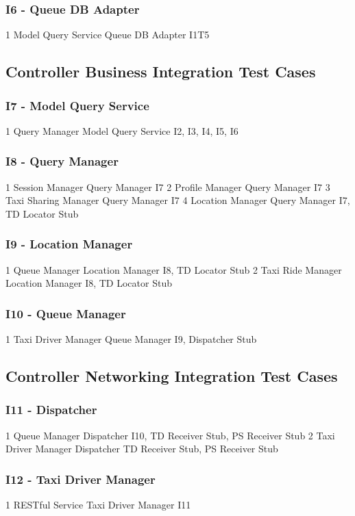 \subsubsection{I6 - Queue DB Adapter}
\testCaseSimpleSimple
	{1}
	{Model Query Service}
	{Queue DB Adapter}
	{I1T5}
\subsection{Controller Business Integration Test Cases}
\subsubsection{I7 - Model Query Service}
\testCaseSimpleSimple
	{1}
	{Query Manager}
	{Model Query Service}
	{I2, I3, I4, I5, I6}
\subsubsection{I8 - Query Manager}
\testCaseSimpleSimple
	{1}
	{Session Manager}
	{Query Manager}
	{I7}
\testCaseSimpleSimple
	{2}
	{Profile Manager}
	{Query Manager}
	{I7}
\testCaseSimpleSimple
	{3}
	{Taxi Sharing Manager}
	{Query Manager}
	{I7}
\testCaseSimpleSimple
	{4}
	{Location Manager}
	{Query Manager}
	{I7, TD Locator Stub}
\subsubsection{I9 - Location Manager}
\testCaseSimpleSimple
	{1}
	{Queue Manager}
	{Location Manager}
	{I8, TD Locator Stub}
\testCaseSimpleSimple
	{2}
	{Taxi Ride Manager}
	{Location Manager}
	{I8, TD Locator Stub}
\subsubsection{I10 - Queue Manager}
\testCaseSimpleSimple
	{1}
	{Taxi Driver Manager}
	{Queue Manager}
	{I9, Dispatcher Stub}
	
\subsection{Controller Networking Integration Test Cases}
\subsubsection{I11 - Dispatcher}
\testCaseSimpleSimple
	{1}
	{Queue Manager}
	{Dispatcher}
	{I10, TD Receiver Stub, PS Receiver Stub}
\testCaseSimpleSimple
	{2}
	{Taxi Driver Manager}
	{Dispatcher}
	{TD Receiver Stub, PS Receiver Stub}
\subsubsection{I12 - Taxi Driver Manager}
\testCaseSimpleSimple
	{1}
	{RESTful Service}
	{Taxi Driver Manager}
	{I11}

